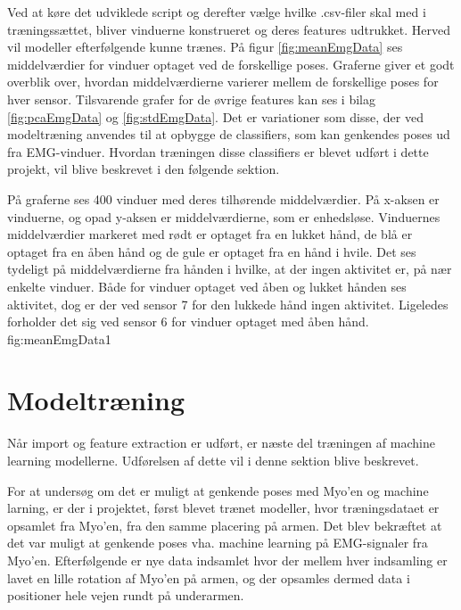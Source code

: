 Ved at køre det udviklede script og derefter vælge hvilke .csv-filer skal med i træningssættet, bliver vinduerne konstrueret og deres features udtrukket. Herved vil modeller efterfølgende kunne trænes. På figur \ref{fig:meanEmgData} ses middelværdier for vinduer optaget ved de forskellige poses. Graferne giver et godt overblik over, hvordan middelværdierne varierer mellem de forskellige poses for hver sensor. Tilsvarende grafer for de øvrige features kan ses i bilag \ref{fig:pcaEmgData} og \ref{fig:stdEmgData}. Det er variationer som disse, der ved modeltræning anvendes til at opbygge de classifiers, som kan genkendes poses ud fra EMG-vinduer. Hvordan træningen disse classifiers er blevet udført i dette projekt, vil blive beskrevet i den følgende sektion.

{
	På graferne ses 400 vinduer med deres tilhørende middelværdier. På x-aksen er vinduerne, og opad y-aksen er middelværdierne, som er enhedsløse. Vinduernes middelværdier markeret med rødt er optaget fra en lukket hånd, de blå er optaget fra en åben hånd og de gule er optaget fra en hånd i hvile. Det ses tydeligt på middelværdierne fra hånden i hvilke, at der ingen aktivitet er, på nær enkelte vinduer. Både for vinduer optaget ved åben og lukket hånden ses aktivitet, dog er der ved sensor 7 for den lukkede hånd ingen aktivitet. Ligeledes forholder det sig ved sensor 6 for vinduer optaget med åben hånd.
 }{fig:meanEmgData}{1}

\section{Modeltræning}
Når import og feature extraction er udført, er næste del træningen af machine learning modellerne. Udførelsen af dette vil i denne sektion blive beskrevet.


For at undersøg om det er muligt at genkende poses med Myo'en og machine larning, er der i projektet, først blevet trænet modeller, hvor træningsdataet er opsamlet fra Myo'en, fra den samme placering på armen. Det blev bekræftet at det var muligt at genkende poses vha. machine learning på EMG-signaler fra Myo'en. Efterfølgende er nye data indsamlet hvor der mellem hver indsamling er lavet en lille rotation af Myo'en på armen, og der opsamles dermed data i positioner hele vejen rundt på underarmen.

